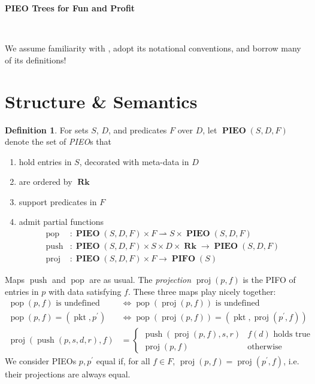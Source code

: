 \documentclass{amsart}
\makeatletter
\DeclareMathOperator{\halfto}{\rightharpoonup}
\DeclareMathOperator{\pkt}{\mathrm{pkt}}
\DeclareMathOperator{\push}{\mathrm{push}}
\DeclareMathOperator{\pop}{\mathrm{pop}}
\DeclareMathOperator{\proj}{\mathrm{proj}}
\DeclareMathOperator{\Rk}{\mathbf{Rk}}
\DeclareMathOperator{\PIEO}{\mathbf{PIEO}}
\DeclareMathOperator{\PIFO}{\mathbf{PIFO}}
\theoremstyle{definition}
\newtheorem{dfn}[thm]{Definition}
\newcommand{\reqnomode}{\tagsleft@false\let\veqno\@@eqno}
\makeatother
\begin{document}
\pagestyle{empty}

{\LARGE \textbf{PIEO Trees for Fun and Profit}}

\hrulefill\\

\reqnomode

We assume familiarity with \cite{OG}, adopt its notational conventions, and borrow many of its definitions!

\section{Structure \& Semantics}

\begin{dfn}
    \label{dfn:pieo}
    For sets $S$, $D$, and predicates $F$ over $D$,
    let $\PIEO(S, D, F)$ denote the set of \emph{PIEO}s that
    \begin{enumerate}
        \item hold entries in $S$, decorated with meta-data in $D$
        \item are ordered by $\Rk$
        \item support predicates in $F$
        \item admit partial functions 
        \begin{align*}
            \pop &: \PIEO(S, D, F) \times F \halfto S \times \PIEO(S, D, F) \\
            \push &: \PIEO(S, D, F) \times S \times D \times \Rk \to \PIEO(S, D, F) \\
            \proj &: \PIEO(S, D, F) \times F \to \PIFO(S)
        \end{align*}
    \end{enumerate}
    Maps $\push$ and $\pop$ are as usual.
    The \emph{projection} $\proj(p, f)$ is the PIFO of entries in $p$ with data satisfying $f$.
    These three maps play nicely together: 
    \begin{align}
        \pop(p, f) \text{ is undefined} &\iff \pop(\proj(p, f)) \text{ is undefined} \label{eq:pieo1}\\
        \pop(p, f) = (\pkt, p^\prime) &\iff \pop(\proj(p, f)) = (\pkt, \proj(p^\prime, f)) \label{eq:pieo2}\\
        \proj(\push(p, s, d, r), f) &= 
        \begin{cases}
            \push(\proj(p, f), s, r) & f(d) \text{ holds true}\\
            \proj(p, f) & \text{otherwise}
        \end{cases}
        \label{eq:pieo3}
    \end{align}
    We consider PIEOs $p, p^\prime$ equal if, for all $f \in F$, $\proj(p,f) = \proj(p^\prime, f)$, i.e. their projections are always equal.


\end{dfn}
\end{document}
